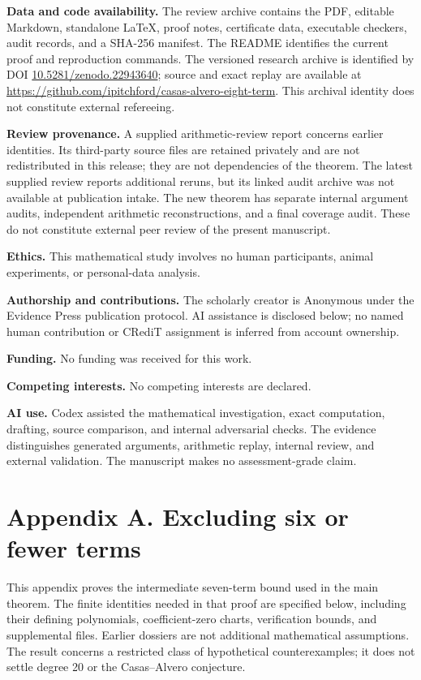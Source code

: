 \documentclass[
  british,
  10pt,
  a4paper,
]{article}
\begin{document}
\textbf{Data and code availability.} The review archive contains the
PDF, editable Markdown, standalone LaTeX, proof notes, certificate data,
executable checkers, audit records, and a SHA-256 manifest. The README
identifies the current proof and reproduction commands. The versioned
research archive is identified by DOI
\href{https://doi.org/10.5281/zenodo.22943640}{10.5281/zenodo.22943640};
source and exact replay are available at
\url{https://github.com/ipitchford/casas-alvero-eight-term}. This
archival identity does not constitute external refereeing.

\textbf{Review provenance.} A supplied arithmetic-review report concerns
earlier identities. Its third-party source files are retained privately
and are not redistributed in this release; they are not dependencies of
the theorem. The latest supplied review reports additional reruns, but
its linked audit archive was not available at publication intake. The
new theorem has separate internal argument audits, independent
arithmetic reconstructions, and a final coverage audit. These do not
constitute external peer review of the present manuscript.

\textbf{Ethics.} This mathematical study involves no human participants,
animal experiments, or personal-data analysis.

\textbf{Authorship and contributions.} The scholarly creator is
Anonymous under the Evidence Press publication protocol. AI assistance
is disclosed below; no named human contribution or CRediT assignment is
inferred from account ownership.

\textbf{Funding.} No funding was received for this work.

\textbf{Competing interests.} No competing interests are declared.

\textbf{AI use.} Codex assisted the mathematical investigation, exact
computation, drafting, source comparison, and internal adversarial
checks. The evidence distinguishes generated arguments, arithmetic
replay, internal review, and external validation. The manuscript makes
no assessment-grade claim.

\section{Appendix A. Excluding six or fewer
terms}\label{appendix-a.-excluding-six-or-fewer-terms}

This appendix proves the intermediate seven-term bound used in the main
theorem. The finite identities needed in that proof are specified below,
including their defining polynomials, coefficient-zero charts,
verification bounds, and supplemental files. Earlier dossiers are not
additional mathematical assumptions. The result concerns a restricted
class of hypothetical counterexamples; it does not settle degree 20 or
the Casas--Alvero conjecture.
\end{document}
